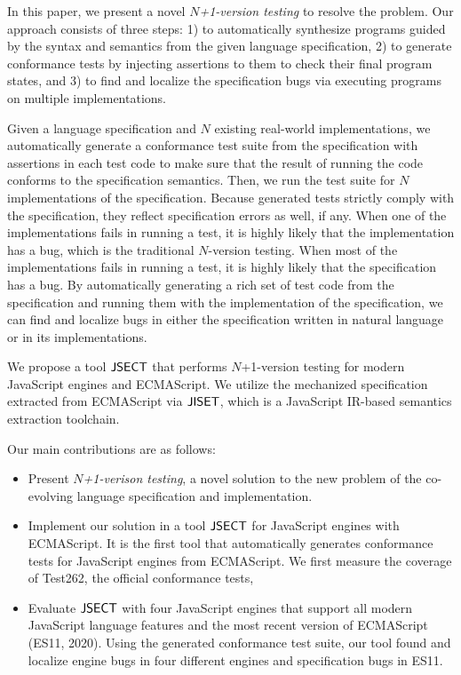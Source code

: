 In this paper, we present a novel \textit{$N$+1-version testing} to resolve the
problem. Our approach consists of three steps: 1) to automatically synthesize
programs guided by the syntax and semantics from the given language
specification, 2) to generate conformance tests by injecting assertions to them
to check their final program states, and 3) to find and localize the
specification bugs via executing programs on multiple implementations.

Given a language specification and $N$ existing real-world implementations, we
automatically generate a conformance test suite from the specification with
assertions in each test code to make sure that the result of running the code
conforms to the specification semantics.  Then, we run the test suite for $N$
implementations of the specification. Because generated tests strictly comply
with the specification, they reflect specification errors as well, if any.  When
one of the implementations fails in running a test, it is highly likely that the
implementation has a bug, which is the traditional $N$-version testing. When
most of the implementations fails in running a test, it is highly likely that
the specification has a bug.  By automatically generating a rich set of test
code from the specification and running them with the implementation of the
specification, we can find and localize bugs in either the specification written
in natural language or in its implementations.

We propose a tool $\text{\sf JSECT}$ that performs $N$+1-version testing for modern
JavaScript engines and ECMAScript.  We utilize the mechanized specification
extracted from ECMAScript via $\text{\sf JISET}$\cite{jiset}, which is a JavaScript
IR-based semantics extraction toolchain.

Our main contributions are as follows:
\begin{itemize}
  \item Present \textit{$N$+1-verison testing}, a novel solution to the new
    problem of the co-evolving language specification and implementation.
  \item Implement our solution in a tool $\text{\sf JSECT}$ for JavaScript engines with
    ECMAScript.  It is the first tool that automatically generates conformance
    tests for JavaScript engines from ECMAScript.  We first measure the coverage
    of Test262, the official conformance tests, 
  \item Evaluate $\text{\sf JSECT}$ with four JavaScript engines that support all modern
    JavaScript language features and the most recent version of ECMAScript
    (ES11, 2020).  Using the generated conformance test suite, our tool found
    and localize  engine bugs in four different engines and 
    specification bugs in ES11.
\end{itemize}

